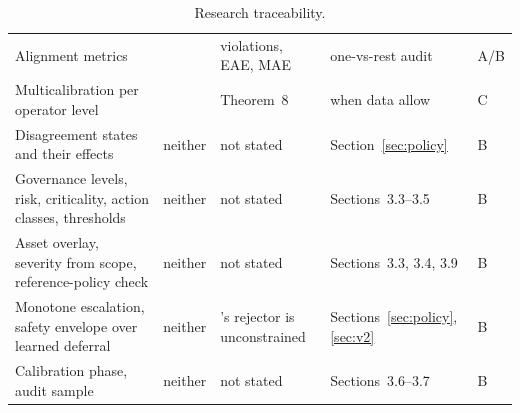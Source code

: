 \documentclass[11pt,a4paper]{article}
\renewcommand{\_}{\textunderscore\allowbreak}
\begin{document}
\begin{table}[H]
\begin{tabularx}{\textwidth}{@{}>{\raggedright\arraybackslash}p{3.6cm}>{\raggedright\arraybackslash}p{1.0cm}LL>{\raggedright\arraybackslash}p{1.0cm}@{}}
Alignment metrics & \cite{benz} & violations, EAE, MAE & one-vs-rest audit & A/B \\
Multicalibration per operator level & \cite{benz} & Theorem~8 & when data allow & C \\
Disagreement states and their effects & neither & not stated & Section~\ref{sec:policy} & B \\
Governance levels, risk, criticality, action classes, thresholds & neither & not stated & Sections~3.3--3.5 & B \\
Asset overlay, severity from scope, reference-policy check & neither & not stated & Sections~3.3, 3.4, 3.9 & B \\
Monotone escalation, safety envelope over learned deferral & neither & \cite{mozannar}'s rejector is unconstrained & Sections~\ref{sec:policy}, \ref{sec:v2} & B \\
Calibration phase, audit sample & neither & not stated & Sections~3.6--3.7 & B \\
\bottomrule
\end{tabularx}
\caption{Research traceability.}
\end{table}
\end{document}
